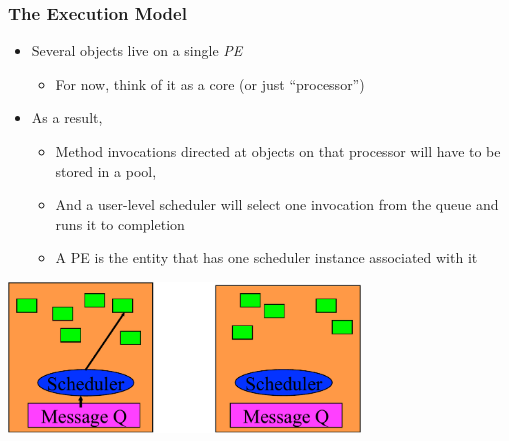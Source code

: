 \begin{frame}[t]
\frametitle{The Execution Model}
  \begin{itemize}
    \item Several objects live on a single {\em PE} 
      \begin{itemize}
        \item For now, think of it as a core (or just ``processor'')
      \end{itemize}
  \pause
  \item As a result, 
    \begin{itemize}
      \item Method invocations directed at objects on that processor will have to be stored in a pool,
      \pause
      \item And a user-level scheduler will select one invocation from the queue and runs it to completion
      \item A PE is the entity that has one scheduler instance
           associated with it
    \end{itemize}
  \end{itemize}
  \begin{center} \includegraphics[width=0.7\textwidth]{figures/scheduler} \end{center}
\end{frame}

